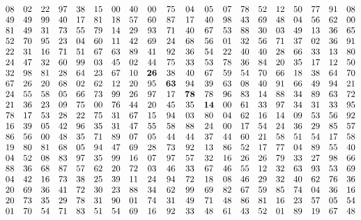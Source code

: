 \documentclass{article}
\begin{document}
	\begin{equation*}
		\setcounter{MaxMatrixCols}{20}
		\begin{matrix}
			08 & 02 & 22 & 97 & 38 & 15 & 00 & 40 & 00 & 75 & 04 & 05 & 07 & 78 & 52 & 12 & 50 & 77 & 91 & 08 \\
			49 & 49 & 99 & 40 & 17 & 81 & 18 & 57 & 60 & 87 & 17 & 40 & 98 & 43 & 69 & 48 & 04 & 56 & 62 & 00 \\
			81 & 49 & 31 & 73 & 55 & 79 & 14 & 29 & 93 & 71 & 40 & 67 & 53 & 88 & 30 & 03 & 49 & 13 & 36 & 65 \\
			52 & 70 & 95 & 23 & 04 & 60 & 11 & 42 & 69 & 24 & 68 & 56 & 01 & 32 & 56 & 71 & 37 & 02 & 36 & 91 \\
			22 & 31 & 16 & 71 & 51 & 67 & 63 & 89 & 41 & 92 & 36 & 54 & 22 & 40 & 40 & 28 & 66 & 33 & 13 & 80 \\
			24 & 47 & 32 & 60 & 99 & 03 & 45 & 02 & 44 & 75 & 33 & 53 & 78 & 36 & 84 & 20 & 35 & 17 & 12 & 50 \\
			32 & 98 & 81 & 28 & 64 & 23 & 67 & 10 & \mathbf{26} & 38 & 40 & 67 & 59 & 54 & 70 & 66 & 18 & 38 & 64 & 70 \\
			67 & 26 & 20 & 68 & 02 & 62 & 12 & 20 & 95 & \mathbf{63} & 94 & 39 & 63 & 08 & 40 & 91 & 66 & 49 & 94 & 21 \\
			24 & 55 & 58 & 05 & 66 & 73 & 99 & 26 & 97 & 17 & \mathbf{78} & 78 & 96 & 83 & 14 & 88 & 34 & 89 & 63 & 72 \\
			21 & 36 & 23 & 09 & 75 & 00 & 76 & 44 & 20 & 45 & 35 & \mathbf{14} & 00 & 61 & 33 & 97 & 34 & 31 & 33 & 95 \\
			78 & 17 & 53 & 28 & 22 & 75 & 31 & 67 & 15 & 94 & 03 & 80 & 04 & 62 & 16 & 14 & 09 & 53 & 56 & 92 \\
			16 & 39 & 05 & 42 & 96 & 35 & 31 & 47 & 55 & 58 & 88 & 24 & 00 & 17 & 54 & 24 & 36 & 29 & 85 & 57 \\
			86 & 56 & 00 & 48 & 35 & 71 & 89 & 07 & 05 & 44 & 44 & 37 & 44 & 60 & 21 & 58 & 51 & 54 & 17 & 58 \\
			19 & 80 & 81 & 68 & 05 & 94 & 47 & 69 & 28 & 73 & 92 & 13 & 86 & 52 & 17 & 77 & 04 & 89 & 55 & 40 \\
			04 & 52 & 08 & 83 & 97 & 35 & 99 & 16 & 07 & 97 & 57 & 32 & 16 & 26 & 26 & 79 & 33 & 27 & 98 & 66 \\
			88 & 36 & 68 & 87 & 57 & 62 & 20 & 72 & 03 & 46 & 33 & 67 & 46 & 55 & 12 & 32 & 63 & 93 & 53 & 69 \\
			04 & 42 & 16 & 73 & 38 & 25 & 39 & 11 & 24 & 94 & 72 & 18 & 08 & 46 & 29 & 32 & 40 & 62 & 76 & 36 \\
			20 & 69 & 36 & 41 & 72 & 30 & 23 & 88 & 34 & 62 & 99 & 69 & 82 & 67 & 59 & 85 & 74 & 04 & 36 & 16 \\
			20 & 73 & 35 & 29 & 78 & 31 & 90 & 01 & 74 & 31 & 49 & 71 & 48 & 86 & 81 & 16 & 23 & 57 & 05 & 54 \\
			01 & 70 & 54 & 71 & 83 & 51 & 54 & 69 & 16 & 92 & 33 & 48 & 61 & 43 & 52 & 01 & 89 & 19 & 67 & 48 \\
		\end{matrix}
	\end{equation*}
\end{document}
